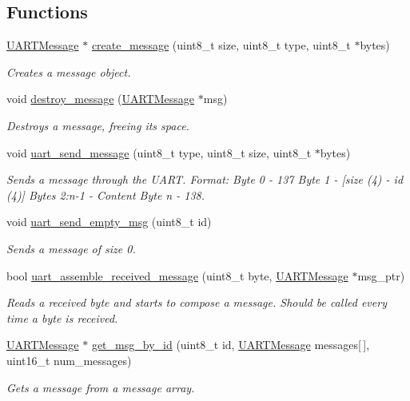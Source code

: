 \subsection*{Functions}
\begin{DoxyCompactItemize}
\item 
\mbox{\hyperlink{struct_u_a_r_t_message}{U\+A\+R\+T\+Message}} $\ast$ \mbox{\hyperlink{group__uart__protocol_ga86ef94bd59a3b296a7c80badb2bea00a}{create\+\_\+message}} (uint8\+\_\+t size, uint8\+\_\+t type, uint8\+\_\+t $\ast$bytes)
\begin{DoxyCompactList}\small\item\em Creates a message object. \end{DoxyCompactList}\item 
void \mbox{\hyperlink{group__uart__protocol_ga8bef6ea297e99b49a0dc05fc16f1a8f5}{destroy\+\_\+message}} (\mbox{\hyperlink{struct_u_a_r_t_message}{U\+A\+R\+T\+Message}} $\ast$msg)
\begin{DoxyCompactList}\small\item\em Destroys a message, freeing its space. \end{DoxyCompactList}\item 
void \mbox{\hyperlink{group__uart__protocol_ga5f455eb88a92b234368bc2d77c295f6a}{uart\+\_\+send\+\_\+message}} (uint8\+\_\+t type, uint8\+\_\+t size, uint8\+\_\+t $\ast$bytes)
\begin{DoxyCompactList}\small\item\em Sends a message through the U\+A\+RT. Format\+: Byte 0 -\/ 137 Byte 1 -\/ \mbox{[}size (4) -\/ id (4)\mbox{]} Bytes 2\+:n-\/1 -\/ Content Byte n -\/ 138. \end{DoxyCompactList}\item 
void \mbox{\hyperlink{group__uart__protocol_ga135e4c7043b1c4cd01caa52830b459de}{uart\+\_\+send\+\_\+empty\+\_\+msg}} (uint8\+\_\+t id)
\begin{DoxyCompactList}\small\item\em Sends a message of size 0. \end{DoxyCompactList}\item 
bool \mbox{\hyperlink{group__uart__protocol_gaf24bc3ddb7d648a8a12a221c7a2e75af}{uart\+\_\+assemble\+\_\+received\+\_\+message}} (uint8\+\_\+t byte, \mbox{\hyperlink{struct_u_a_r_t_message}{U\+A\+R\+T\+Message}} $\ast$msg\+\_\+ptr)
\begin{DoxyCompactList}\small\item\em Reads a received byte and starts to compose a message. Should be called every time a byte is received. \end{DoxyCompactList}\item 
\mbox{\hyperlink{struct_u_a_r_t_message}{U\+A\+R\+T\+Message}} $\ast$ \mbox{\hyperlink{group__uart__protocol_gad448b41c7ab4a7e6ee93351e1475f829}{get\+\_\+msg\+\_\+by\+\_\+id}} (uint8\+\_\+t id, \mbox{\hyperlink{struct_u_a_r_t_message}{U\+A\+R\+T\+Message}} messages\mbox{[}$\,$\mbox{]}, uint16\+\_\+t num\+\_\+messages)
\begin{DoxyCompactList}\small\item\em Gets a message from a message array. \end{DoxyCompactList}\end{DoxyCompactItemize}
